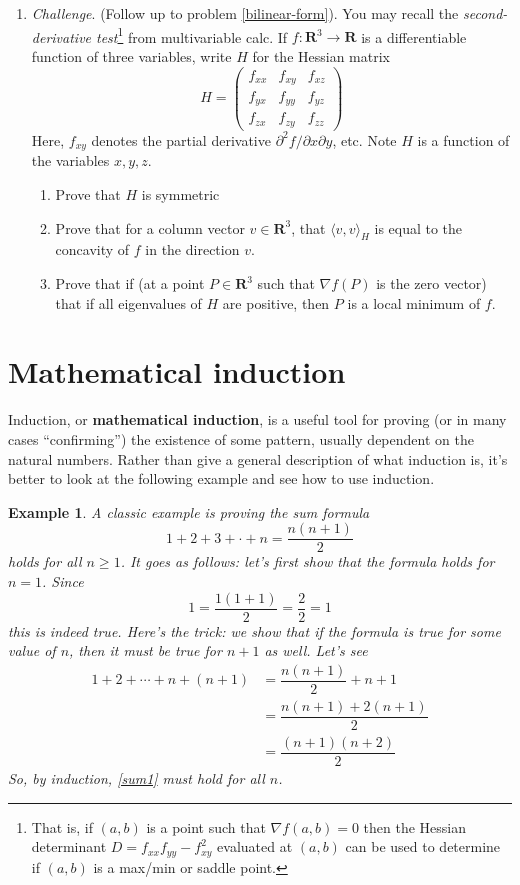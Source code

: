 \documentclass[12pt]{article}
\numberwithin{equation}{subsection}
\theoremstyle{note}
\newtheorem{example}[subsection]{Example}
\begin{document}
\begin{enumerate}[label=\arabic*.]
	\item \textit{Challenge}. (Follow up to problem \ref{bilinear-form}). You may recall the \textit{second-derivative test}\footnote{That is, if $(a,b)$ is a point such that $\nabla f(a,b)=0$ then the Hessian determinant $D=f_{xx}f_{yy}-f_{xy}^2$ evaluated at $(a,b)$ can be used to determine if $(a,b)$ is a max/min or saddle point.} from multivariable calc. If $f\colon \mathbf{R}^3\to\mathbf{R}$ is a differentiable function of three variables, write $H$ for the Hessian matrix \[ H= \begin{pmatrix} f_{xx} & f_{xy} & f_{xz} \\ f_{yx} & f_{yy} & f_{yz} \\ f_{zx} & f_{zy} & f_{zz} \end{pmatrix}\]Here, $f_{xy}$ denotes the partial derivative $\partial^2 f/\partial x\partial y$, etc. Note $H$ is a function of the variables $x,y,z$.
	\begin{enumerate}
		\item Prove that $H$ is symmetric
		\item Prove that for a column vector $v\in\mathbf{R}^3$, that $\langle v,v\rangle_H$ is equal to the concavity of $f$ in the direction $v$.
		\item Prove that if (at a point $P\in\mathbf{R}^3$ such that $\nabla f(P)$ is the zero vector) that if all eigenvalues of $H$ are positive, then $P$ is a local minimum of $f$. 
	\end{enumerate}	

	

\end{enumerate}

\appendix
\section{Mathematical induction}

Induction, or \textbf{mathematical induction}, is a useful tool for proving (or in many cases ``confirming'') the existence of some pattern, usually dependent on the natural numbers. Rather than give a general description of what induction is, it's better to look at the following example and see how to use induction. 

\begin{example} A classic example is proving the sum formula \begin{equation} 1+2+3+\cdot+n=\dfrac{n(n+1)}{2} \label{sum1} \end{equation} holds for all $n\geq 1$. It goes as follows: let's first show that the formula holds for $n=1$. Since \[ 1 = \dfrac{1(1+1)}{2}=\dfrac{2}{2}=1\] this is indeed true. Here's the trick: we show that \textit{if} the formula is true for some value of $n$, then it \textit{must} be true for $n+1$ as well. Let's see \begin{align*}
1+2+\cdots+n+(n+1) &= \dfrac{n(n+1)}{2}+n+1\\ &= \dfrac{ n(n+1)+2(n+1)}{2}\\&= \dfrac{(n+1)(n+2)}{2}\end{align*}
So, by induction, \eqref{sum1} must hold for all $n$.
\end{example}
\end{document}
